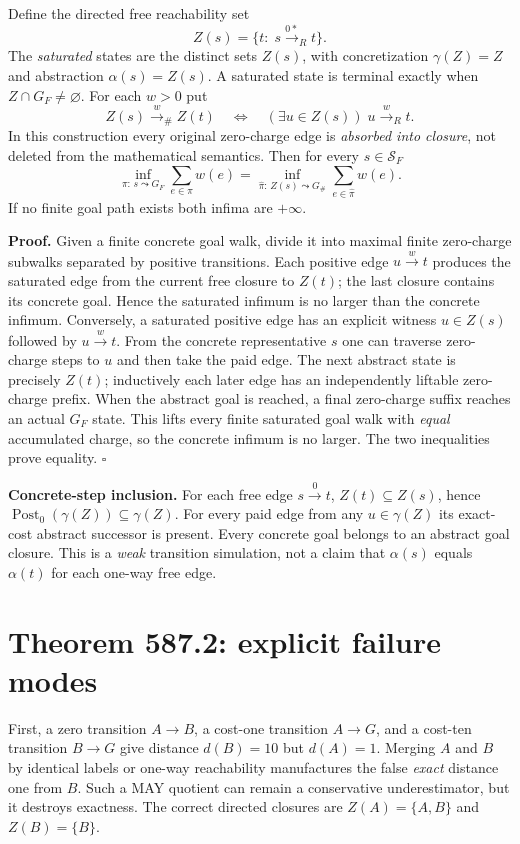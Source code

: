 \documentclass[11pt]{article}
\begin{document}
Define the directed free reachability set
\[
Z(s)=\{t:\;s\xrightarrow{0*}_R t\}.
\]
The \emph{saturated} states are the distinct sets $Z(s)$, with concretization $\gamma(Z)=Z$ and abstraction $\alpha(s)=Z(s)$. A saturated state is terminal exactly when $Z\cap G_F\ne\varnothing$. For each $w>0$ put
\[
Z(s)\xrightarrow{w}_{\#}Z(t)
\quad\Longleftrightarrow\quad
(\exists u\in Z(s))\;u\xrightarrow{w}_R t.
\]
In this construction every original zero-charge edge is \emph{absorbed into closure}, not deleted from the mathematical semantics. Then for every $s\in\mathcal S_F$
\[
\boxed{
\inf_{\pi:\,s\leadsto G_F}\sum_{e\in\pi}w(e)
=
\inf_{\widehat\pi:\,Z(s)\leadsto G_\#}\sum_{e\in\widehat\pi}w(e).
}
\]
If no finite goal path exists both infima are $+\infty$.

\noindent\textbf{Proof.}
Given a finite concrete goal walk, divide it into maximal finite zero-charge subwalks separated by positive transitions. Each positive edge $u\xrightarrow w t$ produces the saturated edge from the current free closure to $Z(t)$; the last closure contains its concrete goal. Hence the saturated infimum is no larger than the concrete infimum.
Conversely, a saturated positive edge has an explicit witness $u\in Z(s)$ followed by $u\xrightarrow w t$. From the concrete representative $s$ one can traverse zero-charge steps to $u$ and then take the paid edge. The next abstract state is precisely $Z(t)$; inductively each later edge has an independently liftable zero-charge prefix. When the abstract goal is reached, a final zero-charge suffix reaches an actual $G_F$ state. This lifts every finite saturated goal walk with \emph{equal} accumulated charge, so the concrete infimum is no larger. The two inequalities prove equality. $\square$

\noindent\textbf{Concrete-step inclusion.} For each free edge $s\xrightarrow0t$, $Z(t)\subseteq Z(s)$, hence $\operatorname{Post}_0(\gamma(Z))\subseteq\gamma(Z)$. For every paid edge from any $u\in\gamma(Z)$ its exact-cost abstract successor is present. Every concrete goal belongs to an abstract goal closure. This is a \emph{weak} transition simulation, not a claim that $\alpha(s)$ equals $\alpha(t)$ for each one-way free edge.

\section*{Theorem 587.2: explicit failure modes}
First, a zero transition $A\to B$, a cost-one transition $A\to G$, and a cost-ten transition $B\to G$ give distance $d(B)=10$ but $d(A)=1$. Merging $A$ and $B$ by identical labels or one-way reachability manufactures the false \emph{exact} distance one from $B$. Such a MAY quotient can remain a conservative underestimator, but it destroys exactness. The correct directed closures are $Z(A)=\{A,B\}$ and $Z(B)=\{B\}$.
\end{document}

